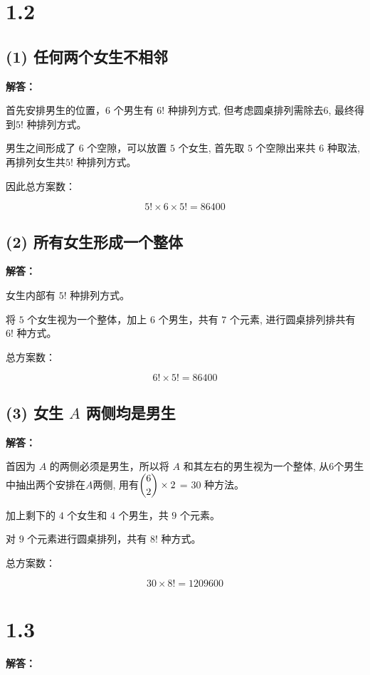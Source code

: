 \documentclass{article}
\begin{document}
\section*{1.2}

\subsection*{(1) 任何两个女生不相邻 }

\textbf{解答：}

首先安排男生的位置，$6$ 个男生有 $6!$ 种排列方式, 但考虑圆桌排列需除去6, 最终得到$5!$ 种排列方式。

男生之间形成了 $6$ 个空隙，可以放置 $5$ 个女生, 首先取 $5$ 个空隙出来共 $6$ 种取法, 再排列女生共$5!$ 种排列方式。

因此总方案数：

\[
 \boxed{5! \times 6 \times 5! = 86400}
\]

\subsection*{(2) 所有女生形成一个整体}

\textbf{解答：}

女生内部有 $5!$ 种排列方式。

将 $5$ 个女生视为一个整体，加上 $6$ 个男生，共有 $7$ 个元素, 进行圆桌排列排共有 $6!$ 种方式。

总方案数：

\[
\boxed{6! \times 5! = 86400}
\]

\subsection*{(3) 女生 $A$ 两侧均是男生}

\textbf{解答：}

首因为 $A$ 的两侧必须是男生，所以将 $A$ 和其左右的男生视为一个整体, 从6个男生中抽出两个安排在$A$两侧, 用有$\dbinom{6}{2} \times 2$ = 30 种方法。

加上剩下的 $4$ 个女生和 $4$ 个男生，共 $9$ 个元素。

对 $9$ 个元素进行圆桌排列，共有 $8!$ 种方式。

总方案数：

\[
\boxed{30 \times 8! = 1209600}
\]

\section*{1.3}
\textbf{解答：}
\end{document}
